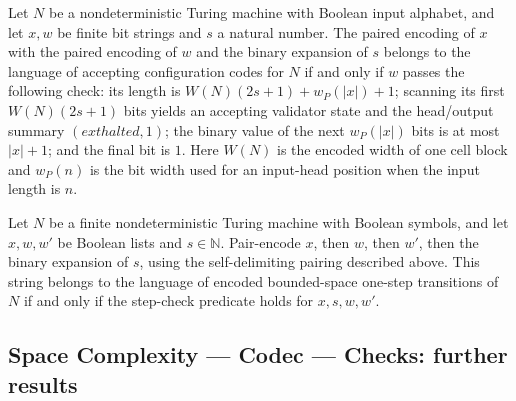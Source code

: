 \begin{theorem}
\label{Complexity.Codec.acceptLang_iff}
\leanok
{}
Let $N$ be a nondeterministic Turing machine with Boolean input alphabet, and let $x,w$
be finite bit strings and $s$ a natural number. The paired encoding of $x$ with the
paired encoding of $w$ and the binary expansion of $s$ belongs to the language of
accepting configuration codes for $N$ if and only if $w$ passes the following check: its
length is $W(N)(2s+1)+w_P(|x|)+1$; scanning its first $W(N)(2s+1)$ bits yields an
accepting validator state and the head/output summary $(	ext{halted},1)$; the binary
value of the next $w_P(|x|)$ bits is at most $|x|+1$; and the final bit is $1$. Here
$W(N)$ is the encoded width of one cell block and $w_P(n)$ is the bit width used for an
input-head position when the input length is $n$.
\end{theorem}

\begin{theorem}
\label{Complexity.Codec.stepLang_iff}
\leanok
{}
Let $N$ be a finite nondeterministic Turing machine with Boolean symbols, and let
$x,w,w'$ be Boolean lists and $s\in\mathbb{N}$. Pair-encode $x$, then $w$, then $w'$,
then the binary expansion of $s$, using the self-delimiting pairing described above.
This string belongs to the language of encoded bounded-space one-step transitions of $N$
if and only if the step-check predicate holds for $x,s,w,w'$.
\end{theorem}

\subsection*{Space Complexity --- Codec --- Checks: further results}


